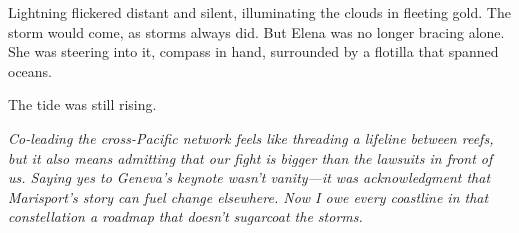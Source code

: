 Lightning flickered distant and silent, illuminating the clouds in fleeting gold. The storm would come, as storms always did. But Elena was no longer bracing alone. She was steering into it, compass in hand, surrounded by a flotilla that spanned oceans.

The tide was still rising.

\noindent\textit{Co-leading the cross-Pacific network feels like threading a lifeline between reefs, but it also means admitting that our fight is bigger than the lawsuits in front of us. Saying yes to Geneva's keynote wasn't vanity—it was acknowledgment that Marisport's story can fuel change elsewhere. Now I owe every coastline in that constellation a roadmap that doesn't sugarcoat the storms.}
